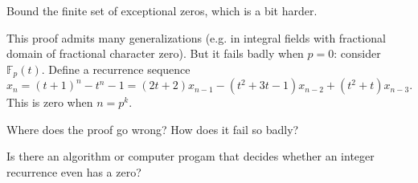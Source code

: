 \begin{ex}
Bound the finite set of exceptional zeros, which is a bit harder.
\end{ex}
This proof admits many generalizations (e.g. in integral fields with fractional domain of fractional character zero). But it fails badly when $p = 0$: consider $\mathbb{F}_p(t)$. Define a recurrence sequence
\[x_n = (t+1)^n-t^n-1 = (2t+2)x_{n-1} -(t^2+3t-1)x_{n-2} +(t^2+t)x_{n-3}.\]
This is zero when $n = p^k$.
\begin{ex}
Where does the proof go wrong? How does it fail so badly?
\end{ex}
\begin{ques}
Is there an algorithm or computer progam that decides whether an integer recurrence even has a zero?
\end{ques}
